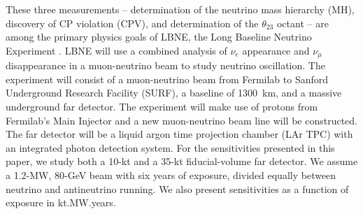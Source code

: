 \documentclass[letterpaper,11pt]{article}
\newcommand{\nue}{\mbox{$\nu_e$}}
\newcommand{\numu}{\mbox{$\nu_{\mu}$}}
\newcommand{\thetatwothree}{\mbox{$\theta_{23}$}}
\begin{document}
These three measurements -- determination of the neutrino mass hierarchy (MH),
discovery of CP violation (CPV), and determination of the $\thetatwothree$ octant
-- are among the primary physics goals of LBNE, the Long Baseline Neutrino
Experiment \cite{LBNE_sciopp}.
LBNE will use a combined analysis of $\nue$ appearance and $\numu$ 
disappearance in a muon-neutrino beam to study neutrino oscillation.
The experiment will consist of a muon-neutrino
beam from Fermilab to Sanford Underground Research Facility (SURF), a 
baseline of 1300~km, and a massive underground far detector. 
The experiment will make use of protons from Fermilab's
Main Injector and a new muon-neutrino beam line will be constructed.
The far detector will be a liquid argon time projection chamber (LAr TPC)
with an integrated photon
detection system. For the sensitivities presented in this paper, we study
both a 10-kt and a 35-kt fiducial-volume far detector. We assume a 1.2-MW,
80-GeV beam with six years of exposure, divided equally between neutrino
and antineutrino running. We also present sensitivities as a function of
exposure in kt.MW.years.
\end{document}
